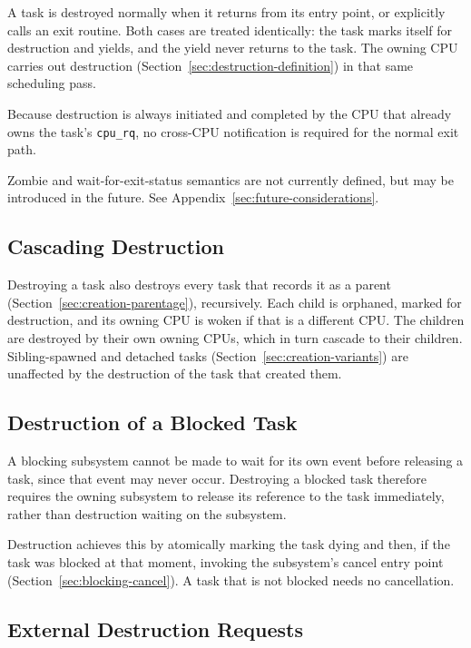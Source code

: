 \documentclass[11pt]{article}
\begin{document}
A task is destroyed normally when it returns from its entry point, or explicitly calls an exit routine.
Both cases are treated identically: the task marks itself for destruction and yields, and the yield never returns to the task.
The owning CPU carries out destruction (Section~\ref{sec:destruction-definition}) in that same scheduling pass.

Because destruction is always initiated and completed by the CPU that already owns the task's \texttt{cpu\_rq}, no cross-CPU notification is required for the normal exit path.

Zombie and wait-for-exit-status semantics are not currently defined, but may be introduced in the future. See Appendix~\ref{sec:future-considerations}.

\subsection{Cascading Destruction}
\label{sec:destruction-cascade}

Destroying a task also destroys every task that records it as a parent (Section~\ref{sec:creation-parentage}), recursively.
Each child is orphaned, marked for destruction, and its owning CPU is woken if that is a different CPU.
The children are destroyed by their own owning CPUs, which in turn cascade to their children.
Sibling-spawned and detached tasks (Section~\ref{sec:creation-variants}) are unaffected by the destruction of the task that created them.

\subsection{Destruction of a Blocked Task}
\label{sec:destruction-blocked}

A blocking subsystem cannot be made to wait for its own event before releasing a task, since that event may never occur.
Destroying a blocked task therefore requires the owning subsystem to release its reference to the task immediately, rather than destruction waiting on the subsystem.

Destruction achieves this by atomically marking the task dying and then, if the task was blocked at that moment, invoking the subsystem's cancel entry point (Section~\ref{sec:blocking-cancel}).
A task that is not blocked needs no cancellation.

\subsection{External Destruction Requests}
\label{sec:destruction-external}
\end{document}
